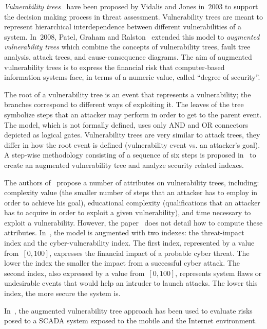 \documentclass[a4paper]{article}
\begin{document}
\emph{Vulnerability trees}~\cite{ViJo} have been proposed by Vidalis and Jones
in~$2003$ to support the decision making process in threat assessment.
Vulnerability trees are meant to represent  hierarchical interdependence between
different  vulnerabilities of a system. In~$2008$, Patel, Graham and
Ralston~\cite{PaGrRa} extended this model to \emph{augmented vulnerability
trees} which combine the concepts of vulnerability trees, fault tree analysis,
attack trees, and cause-consequence diagrams. The aim of augmented vulnerability
trees is to express the financial risk that computer-based information systems
face, in terms of a numeric value, called ``degree of security''.

The root of a vulnerability tree is an event that represents a vulnerability;
the branches correspond to different ways of exploiting it. The leaves of the
tree symbolize steps that an attacker may perform in order to get to the parent
event. The model, which is not formally defined, uses only AND and OR connectors
depicted as logical gates. Vulnerability trees are very similar to attack trees,
they differ in how the root event is defined (vulnerability event vs. an
attacker's goal). A step-wise methodology consisting of a sequence of six steps
is proposed in~\cite{PaGrRa} to create an augmented vulnerability tree
and analyze security related indexes.

The authors of~\cite{ViJo} propose a number of attributes on vulnerability
trees, including: complexity value (the smaller number of steps that an attacker
has to employ in order to achieve his goal), educational complexity
(qualifications that an attacker has to acquire in order to exploit a given
vulnerability), and time necessary to exploit a vulnerability. However, the
paper~\cite{ViJo} does not detail how to compute these attributes.
In~\cite{PaGrRa}, the model is augmented with two indexes: the threat-impact
index and the cyber-vulnerability index. The first index, represented by a value
from~$[0,100]$, expresses the financial impact of a probable cyber threat. The
lower the index the smaller the impact from a successful cyber attack. The
second index, also expressed by a value from~$[0,100]$, represents system flaws
or undesirable events that would help an intruder to launch attacks. The lower
this index, the more secure the system is.

In~\cite{TaJo}, the augmented vulnerability tree approach has been used to
evaluate risks posed to a SCADA system exposed to the mobile and the Internet 
environment.
\end{document}
